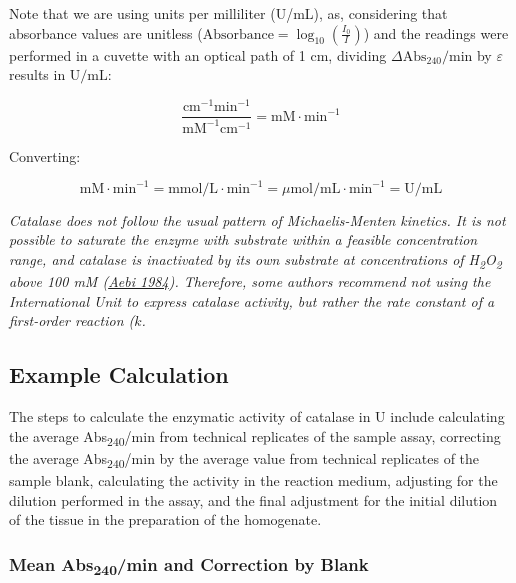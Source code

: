 \documentclass[
  9pt,
  american,
  a5paper,
  extrafontsizes,onecolumn,openright
  ]{memoir}
\newlength{\rf}
\begin{document}
Note that we are using units per milliliter (U/mL), as, considering that absorbance values are unitless (\(\text{Absorbance} = \log_{10} \left( \frac{I_0}{I} \right)\)) and the readings were performed in a cuvette with an optical path of 1 cm, dividing \(\Delta \text{Abs}_{240}/\text{min}\) by \(\varepsilon\) results in \(\text{U/mL}\):

\[ \frac{\text{cm}^{-1}\text{min}^{-1}}{\text{mM}^{-1}\text{cm}^{-1}} = \text{mM} \cdot \text{min}^{-1} \]

Converting:

\[ \text{mM} \cdot \text{min}^{-1} = \text{mmol/L} \cdot \text{min}^{-1} = \mu\text{mol/mL} \cdot \text{min}^{-1} = \text{U/mL} \]

\begin{greybox}[frametitle = Note]
\emph{Catalase does not follow the usual pattern of Michaelis-Menten kinetics. It is not possible to saturate the enzyme with substrate within a feasible concentration range, and catalase is inactivated by its own substrate at concentrations of H\textsubscript{2}O\textsubscript{2} above 100 mM (\href{https://doi.org/10.1016/S0076-6879(84)05016-3}{Aebi 1984}). Therefore, some authors recommend not using the International Unit to express catalase activity, but rather the rate constant of a first-order reaction (\(k\).}

\end{greybox}

\subsection{Example Calculation}\label{example-calculation}

The steps to calculate the enzymatic activity of catalase in U include calculating the average Abs\textsubscript{240}/min from technical replicates of the sample assay, correcting the average Abs\textsubscript{240}/min by the average value from technical replicates of the sample blank, calculating the activity in the reaction medium, adjusting for the dilution performed in the assay, and the final adjustment for the initial dilution of the tissue in the preparation of the homogenate.

\subsubsection{\texorpdfstring{Mean Abs\textsubscript{240}/min and Correction by Blank}{Mean Abs240/min and Correction by Blank}}\label{mean-abs240min-and-correction-by-blank}
\end{document}
